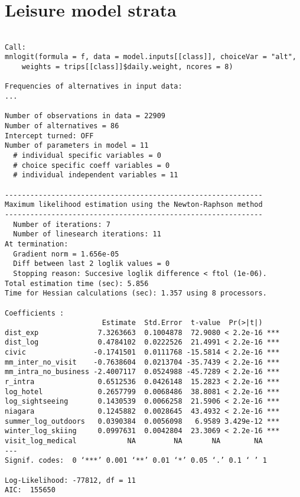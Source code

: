 \section{Leisure model strata}
\begin{verbatim}

Call:
mnlogit(formula = f, data = model.inputs[[class]], choiceVar = "alt", 
    weights = trips[[class]]$daily.weight, ncores = 8)

Frequencies of alternatives in input data:
...

Number of observations in data = 22909
Number of alternatives = 86
Intercept turned: OFF
Number of parameters in model = 11
  # individual specific variables = 0
  # choice specific coeff variables = 0
  # individual independent variables = 11

-------------------------------------------------------------
Maximum likelihood estimation using the Newton-Raphson method
-------------------------------------------------------------
  Number of iterations: 7
  Number of linesearch iterations: 11
At termination: 
  Gradient norm = 1.656e-05
  Diff between last 2 loglik values = 0
  Stopping reason: Succesive loglik difference < ftol (1e-06).
Total estimation time (sec): 5.856
Time for Hessian calculations (sec): 1.357 using 8 processors.

Coefficients : 
                       Estimate  Std.Error  t-value  Pr(>|t|)    
dist_exp              7.3263663  0.1004878  72.9080 < 2.2e-16 ***
dist_log              0.4784102  0.0222526  21.4991 < 2.2e-16 ***
civic                -0.1741501  0.0111768 -15.5814 < 2.2e-16 ***
mm_inter_no_visit    -0.7638604  0.0213704 -35.7439 < 2.2e-16 ***
mm_intra_no_business -2.4007117  0.0524988 -45.7289 < 2.2e-16 ***
r_intra               0.6512536  0.0426148  15.2823 < 2.2e-16 ***
log_hotel             0.2657799  0.0068486  38.8081 < 2.2e-16 ***
log_sightseeing       0.1430539  0.0066258  21.5906 < 2.2e-16 ***
niagara               0.1245882  0.0028645  43.4932 < 2.2e-16 ***
summer_log_outdoors   0.0390384  0.0056098   6.9589 3.429e-12 ***
winter_log_skiing     0.0997631  0.0042804  23.3069 < 2.2e-16 ***
visit_log_medical            NA         NA       NA        NA    
---
Signif. codes:  0 ‘***’ 0.001 ‘**’ 0.01 ‘*’ 0.05 ‘.’ 0.1 ‘ ’ 1

Log-Likelihood: -77812, df = 11
AIC:  155650 


\end{verbatim}
